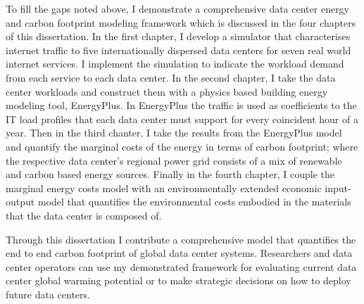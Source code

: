 To fill the gaps noted above, I demonstrate a comprehensive data center energy and carbon footprint modeling framework which is discussed in the four chapters of this dissertation. In the first chapter, I develop a simulator that characterises internet traffic to five internationally dispersed data centers for seven real world internet services. I implement the simulation to indicate the workload demand from each service to each data center. In the second chapter, I take the data center workloads and construct them with a physics based building energy modeling tool, EnergyPlus. In EnergyPlus the traffic is used as coefficients to the IT load profiles that each data center must support for every coincident hour of a year. Then in the third chanter, I take the results from the EnergyPlus model and quantify the marginal costs of the energy in terms of carbon footprint; where the respective data center’s regional power grid consists of a mix of renewable and carbon based energy sources. Finally in the fourth chapter, I couple the marginal energy costs model with an environmentally extended economic input-output model that quantifies the environmental costs embodied in the materials that the data center is composed of. 

Through this dissertation I contribute a comprehensive model that quantifies the end to end carbon footprint of global data center systems. Researchers and data center operators can use my demonstrated framework for evaluating current data center global warming potential or to make strategic decisions on how to deploy future data centers.

 
